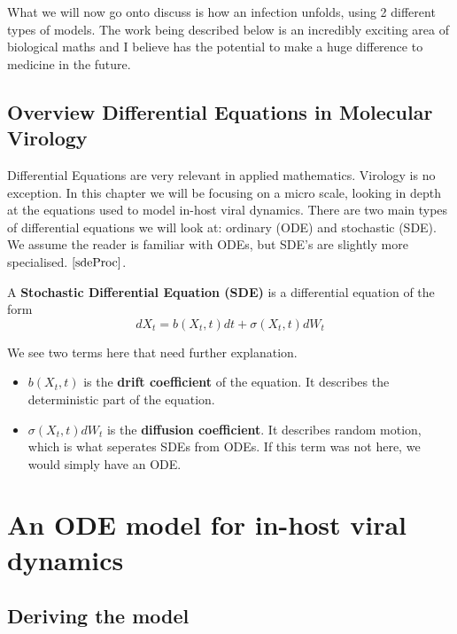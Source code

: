 What we will now go onto discuss is how an infection unfolds, using 2 different types of models. The work being described below is an incredibly exciting area of biological maths and I believe has the potential to make a huge difference to medicine in the future. \\

\subsection{Overview Differential Equations in Molecular Virology}

Differential Equations are very relevant in applied mathematics. Virology is no exception. In this chapter we will be focusing on a micro scale, looking in depth at the equations used to model in-host viral dynamics. There are two main types of differential equations we will look at: ordinary (ODE) and stochastic (SDE). 
We assume the reader is familiar with ODEs, but SDE's are slightly more specialised. $\cite{sdeProc}$.

\begin{definition}
    A \textbf{Stochastic Differential Equation (SDE)} is a differential equation of the form 
    \[
        dX_t = b(X_t,t)dt + \sigma (X_t,t)dW_t
    \]  
\end{definition}

We see two terms here that need further explanation.

\begin{itemize}
    \item $b(X_t,t)$ is the \textbf{drift coefficient} of the equation. It describes the deterministic part of the equation. \\
    \item $\sigma (X_t,t)dW_t$ is the \textbf{diffusion coefficient}. It describes random motion, which is what seperates SDEs from ODEs. If this term was not here, we would simply have an ODE.
\end{itemize}

\section{An ODE model for in-host viral dynamics}

\subsection{Deriving the model}


